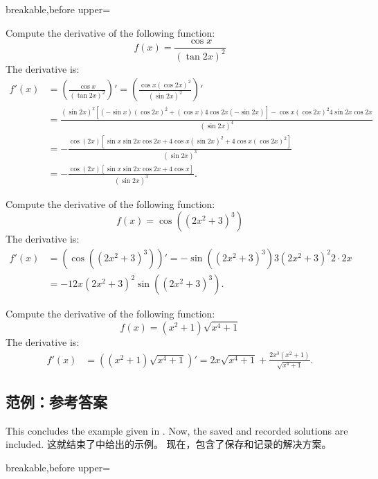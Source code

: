 \begin{dispListing*}{breakable,before upper=}
\begin{exercise}
  Compute the derivative of the following function:
  \begin{equation*}
    f(x)=\frac{\cos x}{(\tan 2x)^2}
  \end{equation*}
\tcblower
  The derivative is:
  \begin{align*}
    f'(x) &= \left( \frac{\cos x}{(\tan 2x)^2} \right)'
    = \left( \frac{\cos x (\cos 2x)^2}{(\sin 2x)^2} \right)'\\
    &= \frac{(\sin 2x)^2 [(-\sin x)(\cos 2x)^2+(\cos x)4\cos 2x (-\sin 2x)]
       - \cos x (\cos 2x)^2 4\sin 2x \cos 2x}{(\sin 2x)^4}\\
    &= -\frac{\cos(2x) [\sin x \sin 2x \cos 2x+ 4\cos x(\sin 2x)^2
       + 4 \cos x (\cos 2x)^2]}{(\sin 2x)^3}\\
    &= -\frac{\cos(2x) [\sin x \sin 2x \cos 2x+ 4\cos x]}{(\sin 2x)^3}.
  \end{align*}
\end{exercise}

\begin{exercise}
  Compute the derivative of the following function:
  \begin{equation*}
    f(x)=\cos((2x^2+3)^3)
  \end{equation*}
\tcblower
  The derivative is:
  \begin{align*}
    f'(x) &= \left( \cos((2x^2+3)^3) \right)'
    =-\sin((2x^2+3)^3) 3(2x^2+3)^2 2\cdot 2x\\
    &=-12x(2x^2+3)^2\sin((2x^2+3)^3).
  \end{align*}
\end{exercise}

\begin{exercise}
  Compute the derivative of the following function:
  \begin{equation*}
    f(x)=(x^2+1)\sqrt{x^4+1}
  \end{equation*}
\tcblower
  The derivative is:
  \begin{align*}
    f'(x) &= \left( (x^2+1)\sqrt{x^4+1} \right)'
    = 2x\sqrt{x^4+1} + \frac{2x^3(x^2+1)}{\sqrt{x^4+1}}.
  \end{align*}
\end{exercise}

\tcbstoprecording
\end{dispListing*}
\tcbusetemp

\subsection{范例：参考答案}\label{sec:recording-solutions}
\begin{stripedbox}
This concludes the example given in .
Now, the saved and recorded solutions are included.
\tcblower
这就结束了中给出的示例。%
现在，包含了保存和记录的解决方案。
\end{stripedbox}


\begin{dispListing*}{breakable,before upper=}
\tcbinputrecords
\end{dispListing*}
\tcbusetemp
